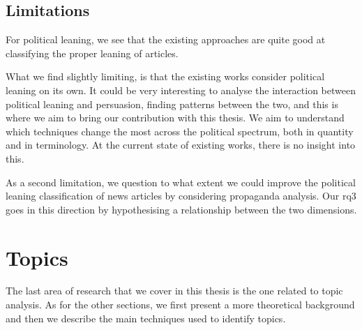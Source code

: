 







\subsection{\statusgreen Limitations}

For political leaning, we see that the existing approaches are quite good at classifying the proper leaning of articles.

What we find slightly limiting, is that the existing works consider political leaning on its own. It could be very interesting to analyse the interaction between political leaning and persuasion, finding patterns between the two, and this is where we aim to bring our contribution with this thesis.
We aim to understand which techniques change the most across the political spectrum, both in quantity and in terminology. At the current state of existing works, there is no insight into this.

As a second limitation, we question to what extent we could improve the political leaning classification of news articles by considering propaganda analysis.
Our \acrshort{rq}3 goes in this direction by hypothesising a relationship between the two dimensions.



\section{\statusgreen Topics}
\label{sec:lit_topics}

The last area of research that we cover in this thesis is the one related to topic analysis.
As for the other sections, we first present a more theoretical background and then we describe the main techniques used to identify topics.

